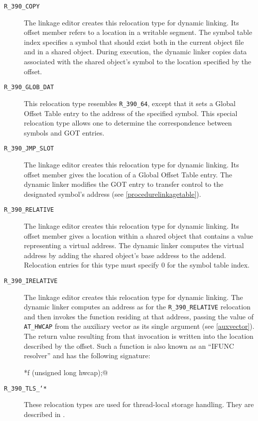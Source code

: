 \documentclass[english,11pt,twoside,toc=bib,toc=idx]{scrreprt}
\newcommand{\NBITS}{64}
\newcommand{\NBITS}{32}
\begin{document}
\begin{description}
\item[\texttt{R\_390\_COPY}] The linkage editor creates this relocation
  type for dynamic linking.  Its offset member refers to a location in a
  writable segment.  The symbol table index specifies a symbol that should
  exist both in the current object file and in a shared object.  During
  execution, the dynamic linker copies data associated with the shared
  object's symbol to the location specified by the offset.
\item[\texttt{R\_390\_GLOB\_DAT}] This relocation type resembles
  \texttt{R\_390\_\NBITS{}}, except that it sets a Global Offset Table
  entry to the address of the specified symbol.  This special relocation
  type allows one to determine the correspondence between symbols and GOT
  entries.
\item[\texttt{R\_390\_JMP\_SLOT}] The linkage editor creates this
  relocation type for dynamic linking.  Its offset member gives the
  location of a Global Offset Table entry.  The dynamic linker modifies
  the GOT entry to transfer control to the designated symbol's address
  (see \cref{procedurelinkagetable}).
\item[\texttt{R\_390\_RELATIVE}] The linkage editor creates this
  relocation type for dynamic linking.  Its offset member gives a location
  within a shared object that contains a value representing a virtual
  address.  The dynamic linker computes the virtual address by adding the
  shared object's base address to the addend.  Relocation entries for this
  type must specify 0 for the symbol table index.
\item[\texttt{R\_390\_IRELATIVE}] The linkage editor creates this
  relocation type for dynamic linking.  The dynamic linker computes an
  address as for the \texttt{R\_390\_RELATIVE} relocation and then invokes
  the function residing at that address, passing the value of
  \texttt{AT\_HWCAP} from the auxiliary vector as its single argument (see
  \cref{auxvector}).  The return value resulting from that invocation is
  written into the location described by the offset.  Such a function is
  also known as an ``IFUNC resolver'' and has the following signature:
  \begin{center}
    \lstinline@void *f (unsigned long hwcap);@
  \end{center}
\item[\texttt{R\_390\_TLS\_\char`*}] These relocation types are used for
  thread-local storage handling.  They are described in
  \cite{tlshandling}.
\end{description}
\end{document}

